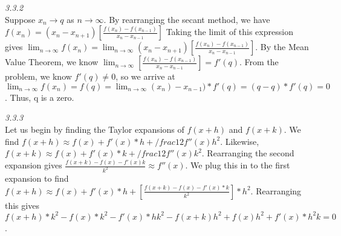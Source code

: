 \documentclass{article}
\begin{document}
\textit{3.3.2}\\

Suppose $x_n \to q$ as $n \to \infty$. 
By rearranging the secant method, we have $f(x_n) = (x_n-x_{n+1})\left[\frac{f(x_n)-f(x_{n-1})}{x_n-x_{n-1}}\right]$
Taking the limit of this expression gives $\lim_{n \to \infty} f(x_n) = \lim_{n \to \infty} (x_n-x_{n+1})\left[\frac{f(x_n)-f(x_{n-1})}{x_n-x_{n-1}}\right]$.
By the Mean Value Theorem, we know $\lim_{n \to \infty} \left[\frac{f(x_n)-f(x_{n-1})}{x_n-x_{n-1}}\right] = f'(q)$. 
From the problem, we know $f'(q) \neq 0$, so we arrive at $\lim_{n \to \infty} f(x_n) = f(q) = \lim_{n \to \infty} (x_n) - x_{n-1})*f'(q) = (q - q)*f'(q) = 0$.
Thus, q is a zero.

\newline
\textit{3.3.3}\\

Let us begin by finding the Taylor expansions of $f(x + h)$ and $f(x + k)$. 
We find $f(x+h) \approx f(x) + f'(x)*h + /frac{1}{2}f''(x)h^2$.
Likewise, $f(x+k) \approx f(x) + f'(x)*k + /frac{1}{2}f''(x)k^2$.
Rearranging the second expansion gives $\frac{f(x+k) -f(x)-f'(x)k}{k^2} \approx f''(x)$.
We plug this in to the first expansion to find $f(x+h) \approx f(x) + f'(x)*h + \left[\frac{f(x+k) - f(x) - f'(x)*k}{k^2}\right]*h^2$.
Rearranging this gives $f(x + h)*k^2 - f(x)*k^2 - f'(x)*hk^2 - f(x+k)h^2 + f(x)h^2 + f'(x)*h^2k = 0$.
\end{document}
